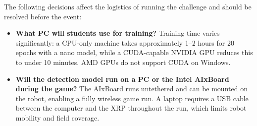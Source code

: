 \documentclass[11pt,a4paper]{article}
\begin{document}
The following decisions affect the logistics of running the challenge and should be resolved before the event:

\begin{itemize}
    \item \textbf{What PC will students use for training?} Training time varies significantly: a CPU-only machine takes approximately 1--2 hours for 20 epochs with a nano model, while a CUDA-capable NVIDIA GPU reduces this to under 10 minutes. AMD GPUs do not support CUDA on Windows.

    \item \textbf{Will the detection model run on a PC or the Intel AIxBoard during the game?} The AIxBoard runs untethered and can be mounted on the robot, enabling a fully wireless game run. A laptop requires a USB cable between the computer and the XRP throughout the run, which limits robot mobility and field coverage.
\end{itemize}



\end{document}
